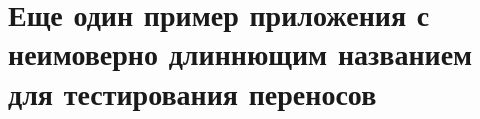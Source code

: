 %
%
\chapter{Еще один пример приложения с неимоверно длиннющим названием для тестирования переносов}\label{sec:app:2}
%
%
%
